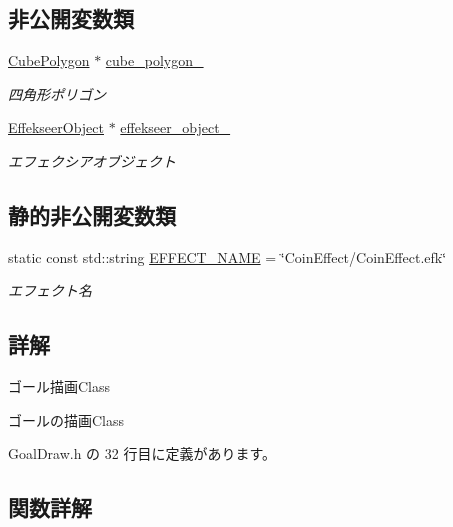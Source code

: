 \subsection*{非公開変数類}
\begin{DoxyCompactItemize}
\item 
\mbox{\hyperlink{class_cube_polygon}{Cube\+Polygon}} $\ast$ \mbox{\hyperlink{class_goal_draw_add3ff2a5f7cd52a76ccfb95c27aa8a07}{cube\+\_\+polygon\+\_\+}}
\begin{DoxyCompactList}\small\item\em 四角形ポリゴン \end{DoxyCompactList}\item 
\mbox{\hyperlink{class_effekseer_object}{Effekseer\+Object}} $\ast$ \mbox{\hyperlink{class_goal_draw_a2d4449f780f6b6fd6dd3e8763fc67b2d}{effekseer\+\_\+object\+\_\+}}
\begin{DoxyCompactList}\small\item\em エフェクシアオブジェクト \end{DoxyCompactList}\end{DoxyCompactItemize}
\subsection*{静的非公開変数類}
\begin{DoxyCompactItemize}
\item 
static const std\+::string \mbox{\hyperlink{class_goal_draw_a7919744cf877c98faa26781ff59fcffe}{E\+F\+F\+E\+C\+T\+\_\+\+N\+A\+ME}} = \char`\"{}Coin\+Effect/Coin\+Effect.\+efk\char`\"{}
\begin{DoxyCompactList}\small\item\em エフェクト名 \end{DoxyCompactList}\end{DoxyCompactItemize}


\subsection{詳解}
ゴール描画\+Class 

ゴールの描画\+Class 

 Goal\+Draw.\+h の 32 行目に定義があります。



\subsection{関数詳解}
\mbox{\label{class_goal_draw_a554c826d7a4534ee489dfe18edf7ee0e}} 
